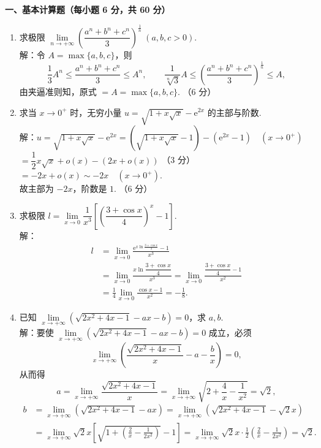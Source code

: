\documentclass[a4paper,11pt]{ctexart}
\newcommand{\e}{\mathrm{e}}
\newcommand{\score}[1]{\hfill（#1）}
\begin{document}
\vspace{0.6em}

\textbf{一、基本计算题（每小题 6 分，共 60 分）}

\begin{enumerate}[label=\arabic*., leftmargin=2em, itemsep=1.0em, topsep=0.5em]
  \item 求极限 $\lim\limits_{n\to+\infty}\left(\dfrac{a^n + b^n + c^n}{3}\right)^{\frac{1}{n}}~(a, b, c > 0)$.\\[0.3em]
  解：令 $A = \max\{a, b, c\}$，则
  \[
    \frac{1}{3}A^n \le \frac{a^n + b^n + c^n}{3} \le A^n,\qquad
    \frac{1}{\sqrt[n]{3}}A \le \left(\frac{a^n + b^n + c^n}{3}\right)^{\frac{1}{n}} \le A, \tag*{（3 分）}
  \]
  由夹逼准则知，原式 $= A = \max\{a, b, c\}$. \score{6 分}

  \item 求当 $x\to 0^+$ 时，无穷小量 $u = \sqrt{1 + x\sqrt{x}} - \e^{2x}$ 的主部与阶数.\\[0.3em]
  解：$u = \sqrt{1 + x\sqrt{x}} - \e^{2x} = (\sqrt{1 + x\sqrt{x}} - 1) - (\e^{2x} - 1)\quad (x\to 0^+)$\\[0.2em]
  $= \dfrac{1}{2}x\sqrt{x} + o(x) - (2x + o(x))$ \score{3 分}\\[0.2em]
  $= -2x + o(x) \sim -2x\quad (x\to 0^+)$.\\[0.2em]
  故主部为 $-2x$，阶数是 $1$. \score{6 分}

  \item 求极限 $l = \lim\limits_{x\to 0}\dfrac{1}{x^3}\left[\left(\dfrac{3 + \cos x}{4}\right)^x - 1\right]$.\\[0.3em]
  解：
  \vspace{-1.8em}
  \begin{align*}
    l &= \lim_{x\to 0}\frac{\e^{x\ln\frac{3+\cos x}{4}} - 1}{x^3} \tag*{（2 分）} \\
      &= \lim_{x\to 0}\frac{x\ln\dfrac{3+\cos x}{4}}{x^3} = \lim_{x\to 0}\frac{\dfrac{3+\cos x}{4} - 1}{x^2} \tag*{（4 分）} \\
      &= \frac{1}{4}\lim_{x\to 0}\frac{\cos x - 1}{x^2} = -\frac{1}{8}. \tag*{（6 分）}
  \end{align*}

  \item 已知 $\lim\limits_{x\to+\infty}\left(\sqrt{2x^2 + 4x - 1} - ax - b\right) = 0$，求 $a, b$.\\[0.3em]
  解：要使 $\lim\limits_{x\to+\infty}\left(\sqrt{2x^2 + 4x - 1} - ax - b\right) = 0$ 成立，必须
  \[
    \lim_{x\to+\infty}\left(\frac{\sqrt{2x^2 + 4x - 1}}{x} - a - \frac{b}{x}\right) = 0,
  \]
  从而得
  \[
    a = \lim_{x\to+\infty}\frac{\sqrt{2x^2 + 4x - 1}}{x} = \lim_{x\to+\infty}\sqrt{2 + \frac{4}{x} - \frac{1}{x^2}} = \sqrt{2}, \tag*{（3 分）}
  \]
  \begin{align*}
    b &= \lim_{x\to+\infty}\left(\sqrt{2x^2 + 4x - 1} - ax\right) = \lim_{x\to+\infty}\left(\sqrt{2x^2 + 4x - 1} - \sqrt{2}x\right) \\
    &= \lim_{x\to+\infty}\sqrt{2}x\left[\sqrt{1 + \left(\frac{2}{x} - \frac{1}{2x^2}\right)} - 1\right]
    = \lim_{x\to+\infty}\sqrt{2}x \cdot \frac{1}{2}\left(\frac{2}{x} - \frac{1}{2x^2}\right) = \sqrt{2}. \tag*{（6 分）}
  \end{align*}


\end{enumerate}
\end{document}

